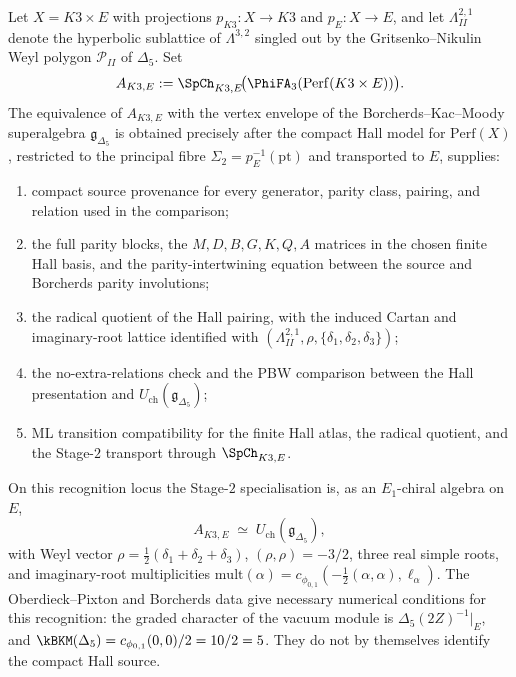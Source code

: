 \begin{theorem}
Let $X = K3 \times E$ with projections $p_{K3}: X \to K3$ and $p_E: X \to E$, and let $\Lambda^{2,1}_{II}$ denote the hyperbolic sublattice of $\Lambda^{3,2}$ singled out by the Gritsenko--Nikulin Weyl polygon $\mathcal{P}_{II}$ of $\Delta_5$. Set
\[
A_{K3,E}:=\SpCh_{K3, E}\!\bigl(\PhiFA_3(\mathrm{Perf}(K3 \times E))\bigr).
\]
The equivalence of $A_{K3,E}$ with the vertex envelope of the Borcherds--Kac--Moody superalgebra $\mathfrak{g}_{\Delta_5}$ is obtained precisely after the compact Hall model for $\mathrm{Perf}(X)$, restricted to the principal fibre $\Sigma_2=p_E^{-1}(\mathrm{pt})$ and transported to $E$, supplies:
\begin{enumerate}[label=\textup{(HB\arabic*)}]
 \item compact source provenance for every generator, parity class, pairing, and relation used in the comparison;
 \item the full parity blocks, the $M,D,B,G,K,Q,A$ matrices in the chosen finite Hall basis, and the parity-intertwining equation between the source and Borcherds parity involutions;
 \item the radical quotient of the Hall pairing, with the induced Cartan and imaginary-root lattice identified with $(\Lambda^{2,1}_{II}, \rho, \{\delta_1,\delta_2,\delta_3\})$;
 \item the no-extra-relations check and the PBW comparison between the Hall presentation and $U_{\mathrm{ch}}(\mathfrak{g}_{\Delta_5})$;
 \item ML transition compatibility for the finite Hall atlas, the radical quotient, and the Stage-$2$ transport through $\SpCh_{K3,E}$.
\end{enumerate}
On this recognition locus the Stage-$2$ specialisation is, as an $E_1$-chiral algebra on $E$,
\[
A_{K3,E}
\;\simeq\; U_{\mathrm{ch}}(\mathfrak{g}_{\Delta_5}),
\]
with Weyl vector $\rho = \tfrac{1}{2}(\delta_1 + \delta_2 + \delta_3)$, $(\rho, \rho) = -3/2$, three real simple roots, and imaginary-root multiplicities $\mathrm{mult}(\alpha) = c_{\phi_{0,1}}(-\tfrac{1}{2}(\alpha, \alpha), \ell_\alpha)$. The Oberdieck--Pixton and Borcherds data give necessary numerical conditions for this recognition: the graded character of the vacuum module is $\Delta_5(2Z)^{-1}\big|_E$, and $\kBKM(\Delta_5) = c_{\phi_{0,1}}(0,0)/2 = 10/2 = 5$. They do not by themselves identify the compact Hall source.
\end{theorem}

